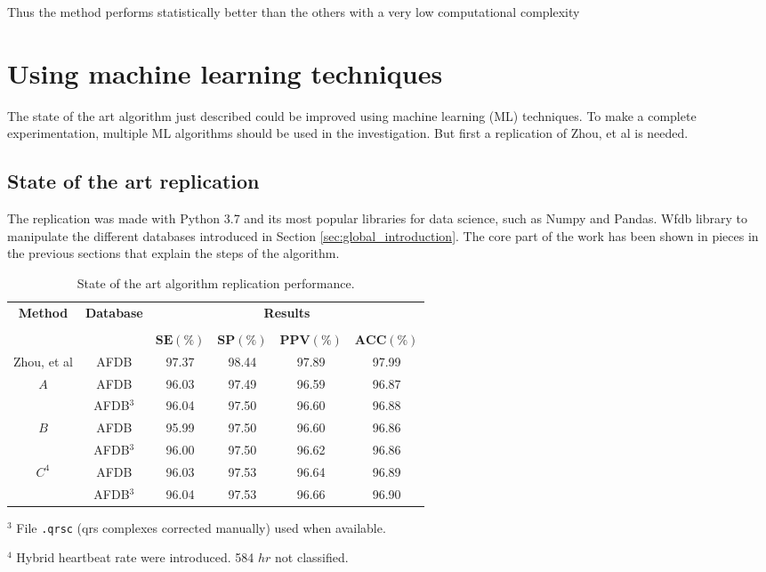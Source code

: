 Thus the method performs statistically better than the others \cite[p. 11]{zhou2015} with a very low computational complexity \cite[p. 14]{zhou2015}

\section{Using machine learning techniques}
The state of the art algorithm just described could be improved using machine learning (ML) techniques. To make a complete experimentation, multiple ML algorithms should be used in the investigation. But first a replication of Zhou, et al\cite{zhou2015} is needed.

\subsection{State of the art replication}
The replication was made with Python 3.7 and its most popular libraries for data science, such as Numpy and Pandas. Wfdb library to manipulate the different databases introduced in Section \ref{sec:global_introduction}.
The core part of the work has been shown in pieces in the previous sections that explain the steps of the algorithm.

\begin{table}[h]
\begin{center}
\begin{threeparttable}
\caption[State of the art algorithm replication performance.]{State of the art algorithm replication performance.}
\label{table:zhou_hr_and_unimol}
\scriptsize
  \begin{tabular}{c c c c c c}
  \toprule
  \textbf{Method} & \textbf{Database} & \multicolumn{4}{c}{\textbf{Results}} \\
  \cline{3-6}
  \\
  & & $\mathbf{SE(\%)}$ & $\mathbf{SP(\%)}$ & $\mathbf{PPV(\%)}$ & $\mathbf{ACC(\%)}$\\
  \midrule  
  Zhou, et al\cite{zhou2015} & AFDB & 97.37 & 98.44 & 97.89 & 97.99 \\
  \hline
  $A$ & AFDB & 96.03 & 97.49 & 96.59 & 96.87 \\
  & AFDB$^3$ & 96.04 & 97.50 & 96.60 & 96.88 \\
  \hline
  $B$ & AFDB & 95.99 & 97.50 & 96.60 & 96.86 \\
  & AFDB$^3$ & 96.00 & 97.50 & 96.62 & 96.86 \\
  \hline
  $C^4$ & AFDB & 96.03 & 97.53 & 96.64 & 96.89 \\
  & AFDB$^3$ & 96.04 & 97.53 & 96.66 & 96.90 \\
  \bottomrule
\end{tabular}
\begin{tablenotes}
 	\item $^3$ File \verb|.qrsc| (qrs complexes corrected manually) used when available.
 	\item $^4$ Hybrid heartbeat rate were introduced. 584 $hr$ not classified.
    \end{tablenotes}
\end{threeparttable}
\end{center}
\end{table}

